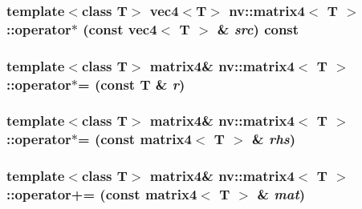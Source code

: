 \hypertarget{classnv_1_1matrix4_f57c6161e485a6b7e518dab91479f94b}{
\subsubsection[{operator$\ast$}]{\setlength{\rightskip}{0pt plus 5cm}template$<$class T$>$ {\bf vec4}$<$T$>$ {\bf nv::matrix4}$<$ T $>$::operator$\ast$ (const {\bf vec4}$<$ T $>$ \& {\em src}) const}}
\label{classnv_1_1matrix4_f57c6161e485a6b7e518dab91479f94b}


\hypertarget{classnv_1_1matrix4_f0a4ab9a41801f1468cc2502591739ec}{
\subsubsection[{operator$\ast$=}]{\setlength{\rightskip}{0pt plus 5cm}template$<$class T$>$ {\bf matrix4}\& {\bf nv::matrix4}$<$ T $>$::operator$\ast$= (const T \& {\em r})}}
\label{classnv_1_1matrix4_f0a4ab9a41801f1468cc2502591739ec}


\hypertarget{classnv_1_1matrix4_952abc3f6b02fc318e488d3267db6111}{
\subsubsection[{operator$\ast$=}]{\setlength{\rightskip}{0pt plus 5cm}template$<$class T$>$ {\bf matrix4}\& {\bf nv::matrix4}$<$ T $>$::operator$\ast$= (const {\bf matrix4}$<$ T $>$ \& {\em rhs})}}
\label{classnv_1_1matrix4_952abc3f6b02fc318e488d3267db6111}


\hypertarget{classnv_1_1matrix4_2678da2a1c5888217e9b73c5415d6164}{
\subsubsection[{operator+=}]{\setlength{\rightskip}{0pt plus 5cm}template$<$class T$>$ {\bf matrix4}\& {\bf nv::matrix4}$<$ T $>$::operator+= (const {\bf matrix4}$<$ T $>$ \& {\em mat})}}
\label{classnv_1_1matrix4_2678da2a1c5888217e9b73c5415d6164}



